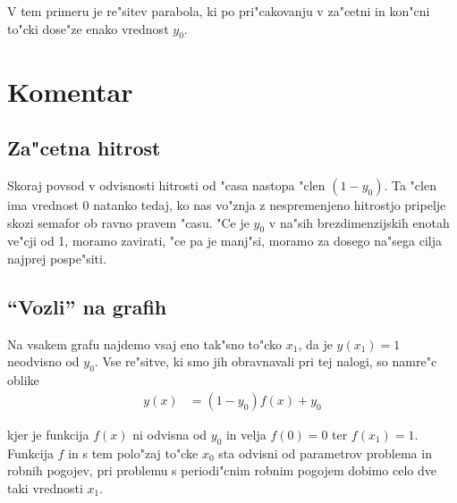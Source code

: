 \documentclass[12pt]{article}
\begin{document}
V tem primeru je re"sitev parabola, ki po pri"cakovanju v za"cetni in kon"cni to"cki dose"ze enako vrednost $y_0$.

\section{Komentar}

\subsection{Za"cetna hitrost}

Skoraj povsod v odvisnosti hitrosti od "casa nastopa "clen $(1-y_0)$. Ta "clen ima vrednost 0 natanko tedaj, ko nas vo"znja z nespremenjeno hitrostjo pripelje skozi semafor ob ravno pravem "casu. "Ce je $y_0$ v na"sih brezdimenzijskih enotah ve"cji od 1, moramo zavirati, "ce pa je manj"si, moramo za dosego na"sega cilja najprej pospe"siti. 

\subsection{``Vozli'' na grafih}

Na vsakem grafu najdemo vsaj eno tak"sno to"cko $x_1$, da je $y(x_1) = 1$ neodvisno od $y_0$. Vse re"sitve, ki smo jih obravnavali pri tej nalogi, so namre"c oblike
\begin{align}
  y(x) &= (1-y_0)f(x) + y_0
\end{align}

kjer je funkcija $f(x)$ ni odvisna od $y_0$ in velja $f(0) = 0$ ter $f(x_1) = 1$. Funkcija $f$ in s tem polo"zaj to"cke $x_0$ sta odvisni od parametrov problema in robnih pogojev, pri problemu s periodi"cnim robnim pogojem dobimo celo dve taki vrednosti $x_1$. 
\end{document}
